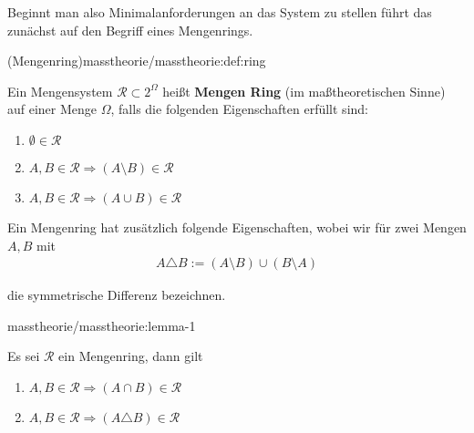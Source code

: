 \par
Beginnt man also Minimalanforderungen an das System zu stellen führt das zunächst auf den Begriff eines Mengenrings.
\begin{definition}{(Mengenring)}{masstheorie/masstheorie:def:ring}



\par
Ein Mengensystem \(\mathcal{R} \subset 2^{\Omega}\) heißt \textbf{Mengen Ring} (im maßtheoretischen Sinne) auf einer Menge \(\Omega\), falls die folgenden Eigenschaften erfüllt sind:
\begin{enumerate}

\item {} 
\par
\(\emptyset \in \mathcal{R}\)

\item {} 
\par
\(A,B \in \mathcal{R} \Rightarrow (A \setminus B) \in \mathcal{R}\)

\item {} 
\par
\(A,B \in \mathcal{R} \Rightarrow (A \cup B) \in \mathcal{R}\)

\end{enumerate}
\end{definition}

\par
Ein Mengenring hat zusätzlich folgende Eigenschaften, wobei wir für zwei Mengen \(A,B\) mit
\begin{align*}
A\triangle B := (A\setminus B)\cup (B\setminus A)
\end{align*}
\par
die symmetrische Differenz bezeichnen.
\begin{lemma}{}{masstheorie/masstheorie:lemma-1}



\par
Es sei \(\mathcal{R}\) ein Mengenring, dann gilt
\begin{enumerate}

\item {} 
\par
\(A,B \in \mathcal{R} \Rightarrow (A \cap B) \in \mathcal{R}\)

\item {} 
\par
\(A,B \in \mathcal{R} \Rightarrow (A \triangle B) \in \mathcal{R}\)

\end{enumerate}
\end{lemma}

